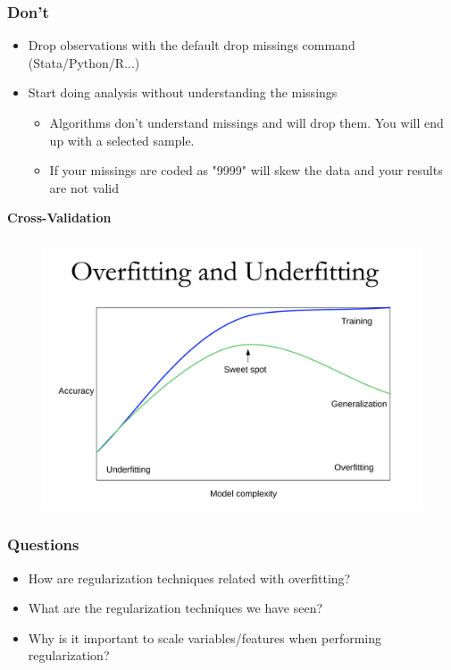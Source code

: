 \documentclass[compress, aspectratio=54]{beamer}
\begin{document}
\begin{frame}
\frametitle{Don't}
\begin{itemize}
\item Drop observations with the default drop missings command  (Stata/Python/R...)

\item Start doing analysis without understanding the missings
\begin{itemize}

\item Algorithms don't understand missings and will drop them. You will end up with a selected sample.
\item If your missings are coded as "9999" will skew the data and your results are not valid
\end{itemize}

\end{itemize}
\end{frame}



\begin{frame}
\begin{center}
\Large{\textbf{Cross-Validation}}
\end{center}
\end{frame}

\begin{frame}
\frametitle{}
\begin{figure}

\includegraphics[width=0.9\linewidth ]{Figures/overfitting.png}
\end{figure}

\end{frame}




\begin{frame}
\frametitle{Questions}
\begin{itemize}

\item How are regularization techniques related with overfitting? 
\item What are the regularization techniques we have seen?
\item Why is it important to scale variables/features when performing regularization?

\end{itemize}
\end{frame}
\end{document}

